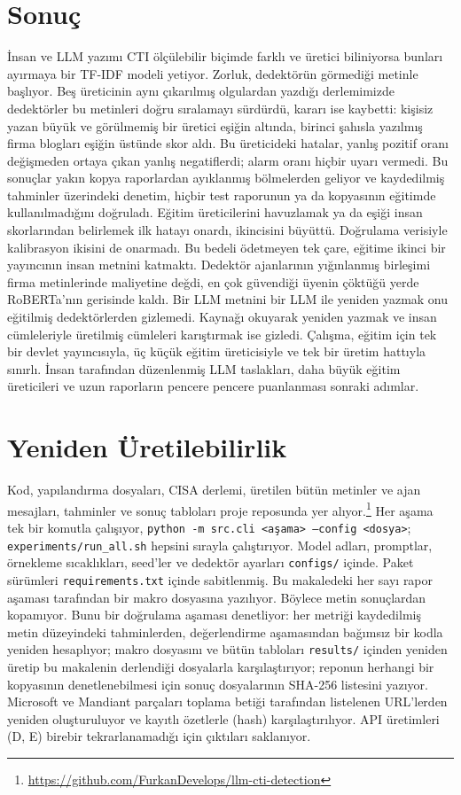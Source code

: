 \documentclass[journal]{IEEEtran}
\begin{document}
\section{Sonuç}
İnsan ve LLM yazımı CTI ölçülebilir biçimde farklı ve üretici biliniyorsa bunları ayırmaya bir TF-IDF modeli
yetiyor. Zorluk, dedektörün görmediği metinle başlıyor. Beş üreticinin aynı çıkarılmış olgulardan yazdığı
derlemimizde dedektörler bu metinleri doğru sıralamayı sürdürdü, kararı ise kaybetti: kişisiz yazan büyük ve
görülmemiş bir üretici eşiğin altında, birinci şahısla yazılmış firma blogları eşiğin üstünde skor aldı. Bu
üreticideki hatalar, yanlış pozitif oranı değişmeden ortaya çıkan yanlış negatiflerdi; alarm oranı hiçbir uyarı
vermedi. Bu sonuçlar yakın kopya raporlardan ayıklanmış bölmelerden geliyor ve kaydedilmiş tahminler üzerindeki
denetim, hiçbir test raporunun ya da kopyasının eğitimde kullanılmadığını doğruladı. Eğitim
üreticilerini havuzlamak ya da eşiği insan skorlarından belirlemek ilk hatayı onardı, ikincisini büyüttü. Doğrulama
verisiyle kalibrasyon ikisini de onarmadı. Bu bedeli ödetmeyen tek çare, eğitime ikinci bir yayıncının insan metnini
katmaktı. Dedektör ajanlarının yığınlanmış birleşimi firma metinlerinde maliyetine değdi, en çok güvendiği üyenin
çöktüğü yerde RoBERTa'nın gerisinde kaldı. Bir LLM metnini bir LLM ile yeniden yazmak onu eğitilmiş dedektörlerden
gizlemedi. Kaynağı okuyarak yeniden yazmak ve insan cümleleriyle üretilmiş cümleleri karıştırmak ise gizledi.
Çalışma, eğitim için tek bir devlet yayıncısıyla, üç küçük eğitim üreticisiyle ve tek bir üretim hattıyla sınırlı.
İnsan tarafından düzenlenmiş LLM taslakları, daha büyük eğitim üreticileri ve uzun raporların pencere pencere
puanlanması sonraki adımlar.

\section*{Yeniden Üretilebilirlik}
Kod, yapılandırma dosyaları, CISA derlemi, üretilen bütün metinler ve ajan mesajları, tahminler ve sonuç tabloları
proje reposunda yer alıyor.\footnote{\url{https://github.com/FurkanDevelops/llm-cti-detection}} Her aşama tek bir
komutla çalışıyor, \texttt{python -m src.cli <aşama> --config <dosya>}; \texttt{experiments/run\_all.sh} hepsini
sırayla çalıştırıyor. Model adları, promptlar, örnekleme sıcaklıkları, seed'ler ve dedektör ayarları
\texttt{configs/} içinde. Paket sürümleri \texttt{requirements.txt} içinde sabitlenmiş. Bu makaledeki her sayı
rapor aşaması tarafından bir makro dosyasına yazılıyor. Böylece metin sonuçlardan kopamıyor. Bunu bir doğrulama
aşaması denetliyor: her metriği kaydedilmiş metin düzeyindeki tahminlerden, değerlendirme aşamasından bağımsız bir
kodla yeniden hesaplıyor; makro dosyasını ve bütün tabloları \texttt{results/} içinden yeniden üretip bu makalenin
derlendiği dosyalarla karşılaştırıyor; reponun herhangi bir kopyasının denetlenebilmesi için sonuç dosyalarının
SHA-256 listesini yazıyor. Microsoft ve Mandiant
parçaları toplama betiği tarafından listelenen URL'lerden yeniden oluşturuluyor ve kayıtlı özetlerle (hash)
karşılaştırılıyor. API üretimleri (D, E) birebir tekrarlanamadığı için çıktıları saklanıyor.



\end{document}
